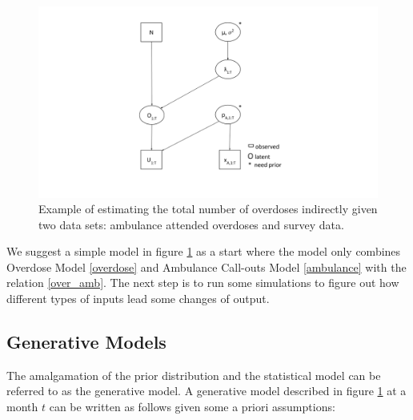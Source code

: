 \documentclass[12pt]{article}
\begin{document}
{\begin{figure}[htb]
	\centering
	\includegraphics[width=200mm,scale=0.5]{Figures/simple_drawing}
	\caption[Example of estimating the total number of overdoses]{Example of estimating the total number of overdoses indirectly given two data sets: ambulance attended overdoses and survey data.}
	\label{simple_draw}
\end{figure}

We suggest a simple model in figure \ref{simple_draw} as a start where the model only combines Overdose Model \ref{overdose} and Ambulance Call-outs Model \ref{ambulance} with the relation \ref{over_amb}. The next step is to run some simulations to figure out how different types of inputs lead some changes of output.

\subsection{Generative Models}
The amalgamation of the prior distribution and the statistical model can be referred to as the generative model.\cite{paul} A generative model described in figure \ref{simple_draw} at a month $t$ can be written as follows given some a priori assumptions:

}
\end{document}

